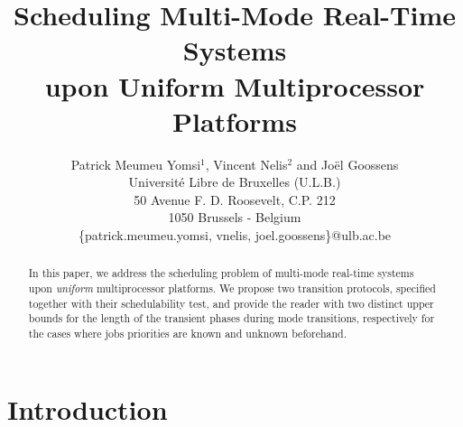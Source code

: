\documentclass[10pt,english,a4paper]{article}
\newtheorem{validity test}{Validity Test}
\begin{document}
\title{Scheduling Multi-Mode Real-Time Systems \\ upon Uniform Multiprocessor Platforms}



\author{
	Patrick Meumeu Yomsi$^1$, Vincent Nelis$^2$ and Jo\"{e}l Goossens\\
	Universit\'{e} Libre de Bruxelles (U.L.B.)\\
         50 Avenue F. D. Roosevelt, C.P. 212\\ 
	1050 Brussels - Belgium \\
	\{patrick.meumeu.yomsi, vnelis, joel.goossens\}@ulb.ac.be \\ 
}

\maketitle
\thispagestyle{empty}

\addtocounter{footnote}{2}
                                                                                                         


\begin{abstract}
In this paper, we address the scheduling problem of multi-mode real-time systems upon {\em uniform} multiprocessor platforms. We propose two transition protocols, specified together with their schedulability test, and provide the reader with two distinct upper bounds for the length of the transient phases during mode transitions, respectively for the cases where jobs priorities are known and unknown beforehand.
\end{abstract}

\vspace{-0.3cm}
\section{Introduction}\label{Introduction}
\end{document}
